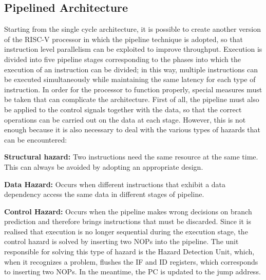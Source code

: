 \subsection{Pipelined Architecture}
Starting from the single cycle architecture, it is possible to create another version of the RISC-V processor in which the pipeline technique is adopted, so that instruction level parallelism can be exploited to improve throughput.
Execution is divided into five pipeline stages corresponding to the phases into which the execution of an instruction can be divided; in this way, multiple instructions can be executed simultaneously while maintaining the same latency for each type of instruction.
In order for the processor to function properly, special measures must be taken that can complicate the architecture. First of all, the pipeline must also be applied to the control signals together with the data, so that the correct operations can be carried out on the data at each stage.
However, this is not enough because it is also necessary to deal with the various types of hazards that can be encountered:
\begin{description}
\item \textbf{Structural hazard:} Two instructions need the same resource at the same time. This can always be avoided by adopting an appropriate design.

\item \textbf{Data Hazard:} Occurs when different instructions that exhibit a data dependency access the same data in different stages of pipeline.

\item \textbf{Control Hazard:} Occurs when the pipeline makes wrong decisions on branch prediction and therefore brings instructions that must be discarded. Since it is realised that execution is no longer sequential during the execution stage, the control hazard is solved by inserting two NOPs into the pipeline. The unit responsible for solving this type of hazard is the Hazard Detection Unit, which, when it recognizes a problem, flushes the IF and ID registers, which corresponds to inserting two NOPs. In the meantime, the PC is updated to the jump address.
\end{description}
